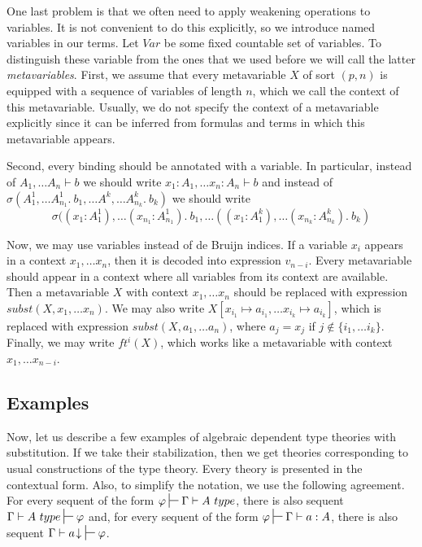 \documentclass[reqno]{amsart}
\theoremstyle{definition}
\theoremstyle{remark}
\numberwithin{figure}{section}
\begin{document}
One last problem is that we often need to apply weakening operations to variables.
It is not convenient to do this explicitly, so we introduce named variables in our terms.
Let $Var$ be some fixed countable set of variables.
To distinguish these variable from the ones that we used before we will call the latter \emph{metavariables}.
First, we assume that every metavariable $X$ of sort $(p,n)$ is equipped with a sequence of variables of length $n$, which we call the context of this metavariable.
Usually, we do not specify the context of a metavariable explicitly since it can be inferred from formulas and terms in which this metavariable appears.

Second, every binding should be annotated with a variable.
In particular, instead of $A_1, \ldots A_n \vdash b$ we should write $x_1 : A_1, \ldots x_n : A_n \vdash b$
and instead of $\sigma(A^1_1, \ldots A^1_{n_1}.\ b_1, \ldots A^k, \ldots A^k_{n_k}.\ b_k)$ we should write
\[ \sigma((x_1 : A^1_1), \ldots (x_{n_1} : A^1_{n_1}).\ b_1, \ldots ((x_1 : A^k_1), \ldots (x_{n_k} : A^k_{n_k}).\ b_k) \]

Now, we may use variables instead of de Bruijn indices.
If a variable $x_i$ appears in a context $x_1, \ldots x_n$, then it is decoded into expression $v_{n-i}$.
Every metavariable should appear in a context where all variables from its context are available.
Then a metavariable $X$ with context $x_1, \ldots x_n$ should be replaced with expression $subst(X, x_1, \ldots x_n)$.
We may also write $X[x_{i_1} \mapsto a_{i_1}, \ldots x_{i_k} \mapsto a_{i_k}]$,
which is replaced with expression $subst(X, a_1, \ldots a_n)$, where $a_j = x_j$ if $j \notin \{ i_1, \ldots i_k \}$.
Finally, we may write $ft^i(X)$, which works like a metavariable with context $x_1, \ldots x_{n-i}$.

\subsection{Examples}

Now, let us describe a few examples of algebraic dependent type theories with substitution.
If we take their stabilization, then we get theories corresponding to usual constructions of the type theory.
Every theory is presented in the contextual form.
Also, to simplify the notation, we use the following agreement.
For every sequent of the form $\varphi \sststile{}{} \Gamma \vdash A\ type$, there is also sequent $\Gamma \vdash A\ type \sststile{}{} \varphi$
and, for every sequent of the form $\varphi \sststile{}{} \Gamma \vdash a : A$, there is also sequent $\Gamma \vdash a\!\downarrow\ \sststile{}{} \varphi$.
\end{document}

